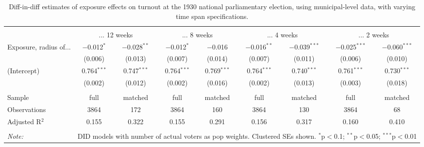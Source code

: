 
\begin{table}[!htbp] \centering 
  \caption{Diff-in-diff estimates of exposure effects on turnout at the 1930 national parliamentary election, using municipal-level data, with varying time span specifications.\vspace{-.25cm}} 
  \label{tab:turnout-timespan-dd-1930comm} 
\scriptsize 
\begin{tabular}{@{\extracolsep{5pt}}lcccccccc} 
\\[-1.8ex]\hline 
\hline \\[-1.8ex] 
 & \multicolumn{2}{c}{... 12 weeks} & \multicolumn{2}{c}{... 8 weeks} & \multicolumn{2}{c}{... 4 weeks} & \multicolumn{2}{c}{... 2 weeks} \\ 
 \cmidrule(r){2-3}\cmidrule(r){4-5}\cmidrule(r){6-7}\cmidrule(r){8-9}Exposure, radius of... & $-$0.012$^{*}$ & $-$0.028$^{**}$ & $-$0.012$^{*}$ & $-$0.016 & $-$0.016$^{**}$ & $-$0.039$^{***}$ & $-$0.025$^{***}$ & $-$0.060$^{***}$ \\ 
  & (0.006) & (0.013) & (0.007) & (0.014) & (0.007) & (0.011) & (0.006) & (0.010) \\ 
  (Intercept) & 0.764$^{***}$ & 0.747$^{***}$ & 0.764$^{***}$ & 0.769$^{***}$ & 0.764$^{***}$ & 0.740$^{***}$ & 0.761$^{***}$ & 0.730$^{***}$ \\ 
  & (0.002) & (0.012) & (0.002) & (0.016) & (0.002) & (0.013) & (0.003) & (0.018) \\ 
 \hline \\[-1.8ex] 
Sample & full & matched & full & matched & full & matched & full & matched \\ 
Observations & 3864 & 172 & 3864 & 160 & 3864 & 130 & 3864 & 68 \\ 
Adjusted R$^{2}$ & 0.155 & 0.322 & 0.155 & 0.291 & 0.156 & 0.317 & 0.160 & 0.410 \\ 
\hline 
\hline \\[-1.8ex] 
\textit{Note:}  & \multicolumn{8}{r}{DID models with number of actual voters as pop weights. Clustered SEs shown. $^{*}$p$<$0.1; $^{**}$p$<$0.05; $^{***}$p$<$0.01} \\ 
\end{tabular} 
\end{table} 
